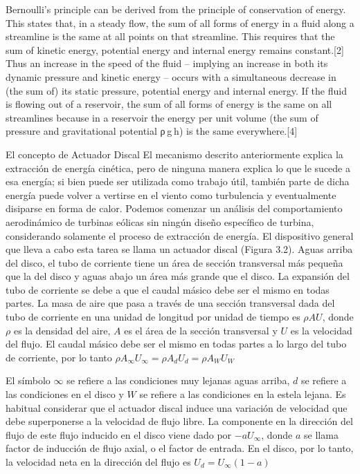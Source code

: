 
Bernoulli's principle can be derived from the principle of conservation of energy. This states that, in a steady flow, the sum of all forms of energy in a fluid along a streamline is the same at all points on that streamline. This requires that the sum of kinetic energy, potential energy and internal energy remains constant.[2] Thus an increase in the speed of the fluid – implying an increase in both its dynamic pressure and kinetic energy – occurs with a simultaneous decrease in (the sum of) its static pressure, potential energy and internal energy. If the fluid is flowing out of a reservoir, the sum of all forms of energy is the same on all streamlines because in a reservoir the energy per unit volume (the sum of pressure and gravitational potential ρ g h) is the same everywhere.[4]


El concepto de Actuador Discal
El mecanismo descrito anteriormente explica la extracción de energía cinética, pero de ninguna manera explica lo que le sucede a esa energía; si bien puede ser utilizada como trabajo útil, también parte de dicha energía puede volver a vertirse en el viento como turbulencia y eventualmente disiparse en forma de calor. Podemos comenzar un análisis del comportamiento aerodinámico de turbinas eólicas sin ningún diseño específico de turbina, considerando solamente el proceso de extracción de energía. El dispositivo general que lleva a cabo esta tarea se llama un actuador discal (Figura 3.2).
Aguas arriba del disco, el tubo de corriente tiene un área de sección transversal más pequeña que la del disco y aguas abajo un área más grande que el disco. La expansión del tubo de corriente se debe a que el caudal másico debe ser el mismo en todas partes. La masa de aire que pasa a través de una sección transversal dada del tubo de corriente en una unidad de longitud por unidad de tiempo es $\rho AU$, donde $\rho$ es la densidad del aire, $A$ es el área de la sección transversal y $U$ es la velocidad del flujo. El caudal másico debe ser el mismo en todas partes a lo largo del tubo de corriente, por lo tanto
$\rho A_{\infty} U_{\infty} = \rho A_d U_d = \rho A_W U_W$

El símbolo $\infty$ se refiere a las condiciones muy lejanas aguas arriba, $d$ se refiere a las condiciones en el disco y $W$ se refiere a las condiciones en la estela lejana. Es habitual considerar que el actuador discal induce una variación de velocidad que debe superponerse a la velocidad de flujo libre. La componente en la dirección del flujo de este flujo inducido en el disco viene dado por $-aU_{\infty}$, donde $a$ se llama factor de inducción de flujo axial, o el factor de entrada. En el disco, por lo tanto, la velocidad neta en la dirección del flujo
es
$U_d = U_{\infty} (1-a)$



